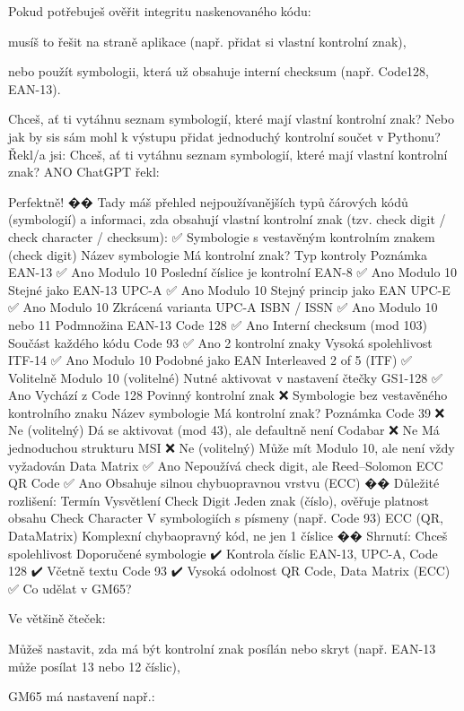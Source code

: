     Pokud potřebuješ ověřit integritu naskenovaného kódu:

        musíš to řešit na straně aplikace (např. přidat si vlastní kontrolní znak),

        nebo použít symbologii, která už obsahuje interní checksum (např. Code128, EAN-13).

Chceš, ať ti vytáhnu seznam symbologií, které mají vlastní kontrolní znak? Nebo jak by sis sám mohl k výstupu přidat jednoduchý kontrolní součet v Pythonu?
Řekl/a jsi:
Chceš, ať ti vytáhnu seznam symbologií, které mají vlastní kontrolní znak? ANO
ChatGPT řekl:

Perfektně! �� Tady máš přehled nejpoužívanějších typů čárových kódů (symbologií) a informaci, zda obsahují vlastní kontrolní znak (tzv. check digit / check character / checksum):
✅ Symbologie s vestavěným kontrolním znakem (check digit)
Název symbologie	Má kontrolní znak?	Typ kontroly	Poznámka
EAN-13	✅ Ano	Modulo 10	Poslední číslice je kontrolní
EAN-8	✅ Ano	Modulo 10	Stejné jako EAN-13
UPC-A	✅ Ano	Modulo 10	Stejný princip jako EAN
UPC-E	✅ Ano	Modulo 10	Zkrácená varianta UPC-A
ISBN / ISSN	✅ Ano	Modulo 10 nebo 11	Podmnožina EAN-13
Code 128	✅ Ano	Interní checksum (mod 103)	Součást každého kódu
Code 93	✅ Ano	2 kontrolní znaky	Vysoká spolehlivost
ITF-14	✅ Ano	Modulo 10	Podobné jako EAN
Interleaved 2 of 5 (ITF)	✅ Volitelně	Modulo 10 (volitelné)	Nutné aktivovat v nastavení čtečky
GS1-128	✅ Ano	Vychází z Code 128	Povinný kontrolní znak
❌ Symbologie bez vestavěného kontrolního znaku
Název symbologie	Má kontrolní znak?	Poznámka
Code 39	❌ Ne (volitelný)	Dá se aktivovat (mod 43), ale defaultně není
Codabar	❌ Ne	Má jednoduchou strukturu
MSI	❌ Ne (volitelný)	Může mít Modulo 10, ale není vždy vyžadován
Data Matrix	✅ Ano	Nepoužívá check digit, ale Reed–Solomon ECC
QR Code	✅ Ano	Obsahuje silnou chybuopravnou vrstvu (ECC)
�� Důležité rozlišení:
Termín	Vysvětlení
Check Digit	Jeden znak (číslo), ověřuje platnost obsahu
Check Character	V symbologiích s písmeny (např. Code 93)
ECC (QR, DataMatrix)	Komplexní chybaopravný kód, ne jen 1 číslice
�� Shrnutí:
Chceš spolehlivost	Doporučené symbologie
✔️ Kontrola číslic	EAN-13, UPC-A, Code 128
✔️ Včetně textu	Code 93
✔️ Vysoká odolnost	QR Code, Data Matrix (ECC)
✅ Co udělat v GM65?

Ve většině čteček:

    Můžeš nastavit, zda má být kontrolní znak posílán nebo skryt (např. EAN-13 může posílat 13 nebo 12 číslic),

    GM65 má nastavení např.:

